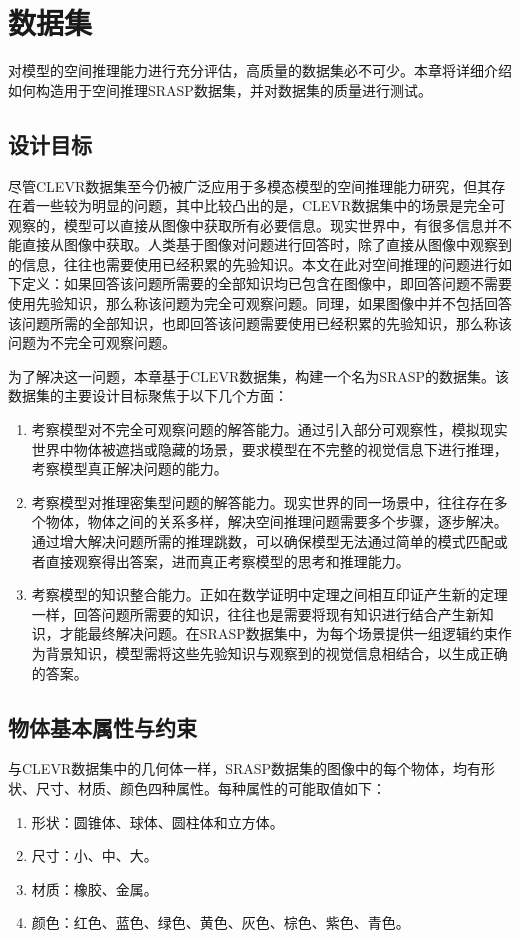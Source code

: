 \chapter{数据集}
对模型的空间推理能力进行充分评估，高质量的数据集必不可少。本章将详细介绍如何构造用于空间推理SRASP数据集，并对数据集的质量进行测试。

\section{设计目标}
尽管CLEVR数据集至今仍被广泛应用于多模态模型的空间推理能力研究，但其存在着一些较为明显的问题，其中比较凸出的是，CLEVR数据集中的场景是完全可观察的，模型可以直接从图像中获取所有必要信息。现实世界中，有很多信息并不能直接从图像中获取。人类基于图像对问题进行回答时，除了直接从图像中观察到的信息，往往也需要使用已经积累的先验知识。本文在此对空间推理的问题进行如下定义：如果回答该问题所需要的全部知识均已包含在图像中，即回答问题不需要使用先验知识，那么称该问题为完全可观察问题。同理，如果图像中并不包括回答该问题所需的全部知识，也即回答该问题需要使用已经积累的先验知识，那么称该问题为不完全可观察问题。

为了解决这一问题，本章基于CLEVR数据集，构建一个名为SRASP的数据集。该数据集的主要设计目标聚焦于以下几个方面：
\begin{enumerate}[label=(\arabic*),itemsep=0pt,parsep=0pt]
\item 考察模型对不完全可观察问题的解答能力。通过引入部分可观察性，模拟现实世界中物体被遮挡或隐藏的场景，要求模型在不完整的视觉信息下进行推理，考察模型真正解决问题的能力。
\item 考察模型对推理密集型问题的解答能力。现实世界的同一场景中，往往存在多个物体，物体之间的关系多样，解决空间推理问题需要多个步骤，逐步解决。通过增大解决问题所需的推理跳数，可以确保模型无法通过简单的模式匹配或者直接观察得出答案，进而真正考察模型的思考和推理能力。
\item 考察模型的知识整合能力。正如在数学证明中定理之间相互印证产生新的定理一样，回答问题所需要的知识，往往也是需要将现有知识进行结合产生新知识，才能最终解决问题。在SRASP数据集中，为每个场景提供一组逻辑约束作为背景知识，模型需将这些先验知识与观察到的视觉信息相结合，以生成正确的答案。
\end{enumerate}

\section{物体基本属性与约束}
与CLEVR数据集中的几何体一样，SRASP数据集的图像中的每个物体，均有形状、尺寸、材质、颜色四种属性。每种属性的可能取值如下：
\begin{enumerate}[label=(\arabic*),itemsep=0pt,parsep=0pt]
    \item 形状：圆锥体、球体、圆柱体和立方体。
    \item 尺寸：小、中、大。
    \item 材质：橡胶、金属。
    \item 颜色：红色、蓝色、绿色、黄色、灰色、棕色、紫色、青色。
\end{enumerate}

